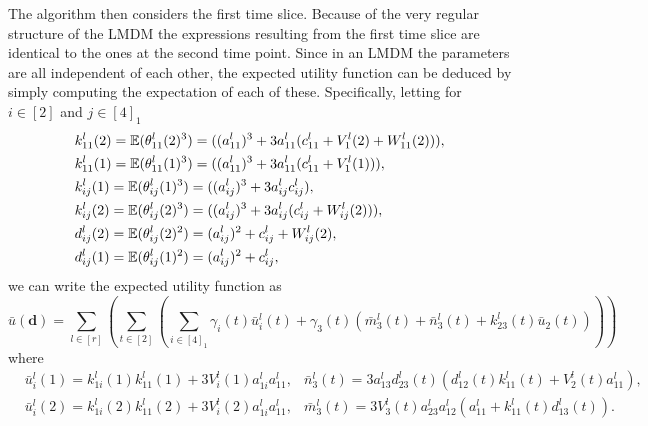 The algorithm then considers the first time slice. Because of the very regular structure of the LMDM the expressions resulting from the first time slice are identical to the ones at the second time point. Since in an LMDM the parameters are all independent of each other, the expected utility function can be deduced by simply computing the expectation of each of these. Specifically, letting for $i\in[2]$ and $j\in[4]_1$
\begin{align*}
&k_{11}^l(2)=\mathbb{E}(\theta_{11}^l(2)^3)=((a_{11}^l)^3+3a_{11}^l(c_{11}^l+V_1^l(2)+W_{11}^l(2))),\\
 &k_{11}^l(1)=\mathbb{E}(\theta_{11}^l(1)^3)=((a_{11}^l)^3+3a_{11}^l(c_{11}^l+V_1^l(1))),\\
 &k_{ij}^l(1)=\mathbb{E}(\theta_{ij}^l(1)^3)=((a_{ij}^l)^3+3a_{ij}^lc_{ij}^l),\\
 &k_{ij}^l(2)=\mathbb{E}(\theta_{ij}^l(2)^3)=((a_{ij}^l)^3+3a_{ij}^l(c_{ij}^l+W_{ij}^l(2))),\\
&d_{ij}^l(2)=\mathbb{E}(\theta_{ij}^l(2)^2)=(a_{ij}^l)^2+c_{ij}^l+W_{ij}^l(2),\\
&d_{ij}^l(1)=\mathbb{E}(\theta_{ij}^l(1)^2)=(a_{ij}^l)^2+c_{ij}^l,
\end{align*}
we can write the expected utility function as 
\begin{equation}
\label{fex1}
\bar{u}(\bm{d})=\sum_{l\in[r]}\left(\sum_{t\in[2]}\left(\sum_{i\in[4]_1}\gamma_{i}(t)\bar{u}_i^l(t)+\gamma_3(t)(\bar{m}_3^l(t)+\bar{n}_3^l(t)+k_{23}^l(t)\bar{u}_2(t))\right)\right)
\end{equation}
where
\begin{align*}
&\bar{u}_i^l(1)=k_{1i}^l(1)k_{11}^l(1)+3V_i^l(1)a_{1i}^la_{11}^l,&\bar{n}_3^l(t)=3a_{13}^ld_{23}^l(t)(d_{12}^l(t)k_{11}^l(t)+V_2^l(t)a_{11}^l),\\
&\bar{u}_i^l(2)=k_{1i}^l(2)k_{11}^l(2)+3V_i^l(2)a_{1i}^la_{11}^l,&\bar{m}_3^l(t)=3V_3^l(t)a_{23}^la_{12}^l(a_{11}^l+k_{11}^l(t)d_{13}^l(t)).
\end{align*}



